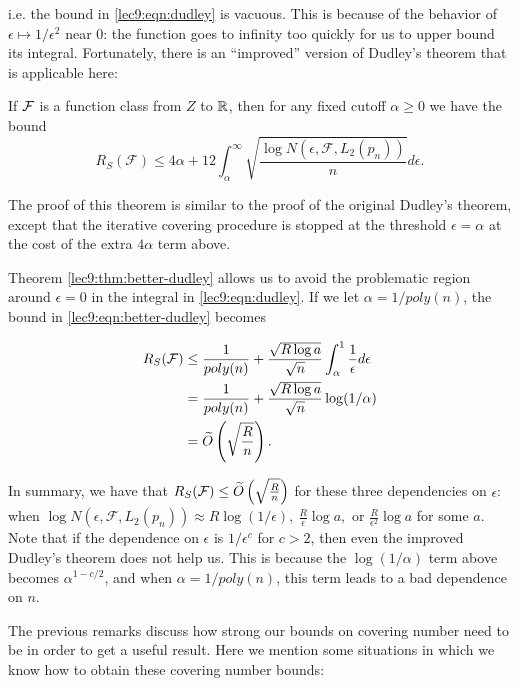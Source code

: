 \begin{enumerate}
i.e. the bound in \eqref{lec9:eqn:dudley} is vacuous. This is because of the behavior of $\epsilon \mapsto 1/\epsilon^2$ near 0: the function goes to infinity too quickly for us to upper bound its integral. Fortunately, there is an ``improved'' version of Dudley's theorem that is applicable here:
        
\begin{theorem}\label{lec9:thm:better-dudley}
If $\mathcal F$ is a function class from $Z$ to $\mathbb R$, then for any fixed cutoff $\alpha \geq 0$ we have the bound
\begin{equation}\label{lec9:eqn:better-dudley}
R_S(\mathcal{F})\leq 4\alpha + 12\int_{\alpha}^{\infty}\sqrt{\frac{\log N(\epsilon, \mathcal{F}, L_2({p_n}))}{n}}d\epsilon.      
\end{equation}
\end{theorem}
The proof of this theorem is similar to the proof of the original Dudley's theorem, except that the iterative covering procedure is stopped at the threshold $\epsilon = \alpha$ at the cost of the extra $4\alpha$ term above.
        
Theorem \ref{lec9:thm:better-dudley} allows us to avoid the problematic region around $\epsilon=0$ in the integral in \eqref{lec9:eqn:dudley}. If we let $\alpha = 1/poly(n)$, the bound in \eqref{lec9:eqn:better-dudley} becomes
        
\begin{align}
R_S(\mathcal{F}) &\leq \frac{1}{poly(n)} + \frac{\sqrt{R\log a}}{\sqrt{n}}\int_{\alpha}^1\frac{1}{\epsilon}d\epsilon \\
&= \frac{1}{poly(n)}  + \frac{\sqrt{R\log a}}{\sqrt{n}} \log(1/\alpha) \\
&= \widetilde{O} \left(\sqrt{\frac{R}{n}}\right).
\end{align}
\end{enumerate}

In summary, we have that $R_S(\mathcal{F}) \leq \widetilde{O}\left(\sqrt{\frac{R}{n}}\right)$ for these three dependencies on $\epsilon$: when $\log N(\epsilon, \mathcal{F}, L_2({p_n})) \approx R\log (1/\epsilon),\ \frac{R}{\epsilon} \log a,\text{ or } \frac{R}{\epsilon^2} \log a$ for some $a$. Note that if the dependence on $\epsilon$ is $1/\epsilon^c$ for $c > 2$, then even the improved Dudley's theorem does not help us. This is because the $\log(1/\alpha)$ term above becomes $\alpha^{1-c/2}$, and when $\alpha = 1/poly(n)$, this term leads to a bad dependence on $n$.

The previous remarks discuss how strong our bounds on covering number need to be in order to get a useful result. Here we mention some situations in which we know how to obtain these covering number bounds:

